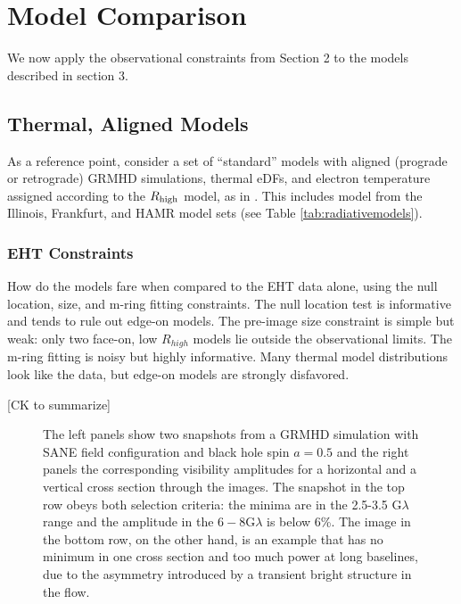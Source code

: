 \section{Model Comparison}\label{sec:comparisons}

We now apply the observational constraints from Section 2 to the models described in section 3.

\subsection{Thermal, Aligned Models}

As a reference point, consider a set of ``standard'' models with aligned (prograde or retrograde) GRMHD simulations, thermal eDFs, and electron temperature assigned according to the $R_\mathrm{high}$ model, as in .  This includes model from the Illinois, Frankfurt, and HAMR model sets (see Table \ref{tab:radiativemodels}).

\subsubsection{EHT Constraints}

How do the models fare when compared to the EHT data alone, using the null location, size, and m-ring fitting constraints.  The null location test is informative and tends to rule out edge-on models.  The pre-image size constraint is simple but weak: only two face-on, low $R_{high}$ models lie outside the observational limits.   The m-ring fitting is noisy but highly informative.  Many thermal model distributions look like the data, but edge-on models are strongly disfavored.


[CK to summarize]


\begin{figure}
  \centering
  [altex]
  \caption{The left panels show two snapshots from a GRMHD simulation
    with SANE field configuration and black hole spin $a=0.5$ and the
    right panels the corresponding visibility amplitudes for a
    horizontal and a vertical cross section through the images.
    The snapshot in the top row obeys both selection criteria: the
    minima are in the 2.5-3.5 G$\lambda$ range and the amplitude in
    the $6-8$G$\lambda$ is below 6\%.
    The image in the bottom row, on the other hand, is an example that
    has no minimum in one cross section and too much power at long
    baselines, due to the asymmetry introduced by a transient bright
    structure in the flow.}
  \label{fig:cmp_VA}
\end{figure}

